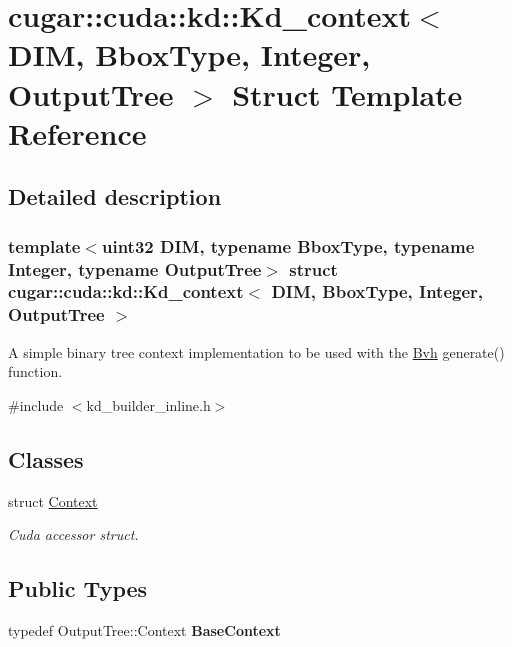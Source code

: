 \hypertarget{structcugar_1_1cuda_1_1kd_1_1_kd__context}{}\section{cugar\+:\+:cuda\+:\+:kd\+:\+:Kd\+\_\+context$<$ D\+IM, Bbox\+Type, Integer, Output\+Tree $>$ Struct Template Reference}
\label{structcugar_1_1cuda_1_1kd_1_1_kd__context}


\subsection{Detailed description}
\subsubsection*{template$<$uint32 D\+IM, typename Bbox\+Type, typename Integer, typename Output\+Tree$>$\newline
struct cugar\+::cuda\+::kd\+::\+Kd\+\_\+context$<$ D\+I\+M, Bbox\+Type, Integer, Output\+Tree $>$}

A simple binary tree context implementation to be used with the \hyperlink{structcugar_1_1_bvh}{Bvh} generate() function. 

{\ttfamily \#include $<$kd\+\_\+builder\+\_\+inline.\+h$>$}

\subsection*{Classes}
\begin{DoxyCompactItemize}
\item 
struct \hyperlink{structcugar_1_1cuda_1_1kd_1_1_kd__context_1_1_context}{Context}
\begin{DoxyCompactList}\small\item\em Cuda accessor struct. \end{DoxyCompactList}\end{DoxyCompactItemize}
\subsection*{Public Types}
\begin{DoxyCompactItemize}
\item 
\mbox{\label{structcugar_1_1cuda_1_1kd_1_1_kd__context_a279264d20b734023d033abf00196be08}} 
typedef Output\+Tree\+::\+Context {\bfseries Base\+Context}
\end{DoxyCompactItemize}

